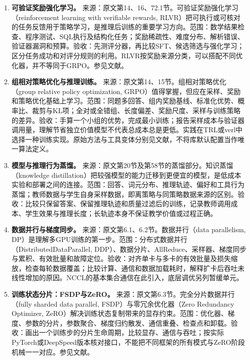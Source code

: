 \documentclass[UTF8,12pt,a4paper,fontset=fandol]{ctexart}
\begin{document}
\begin{enumerate}[resume=techrank]
\item \textbf{可验证奖励强化学习。}\label{tech:rlvr}
来源：原文第14、16、72.1节。可验证奖励强化学习（reinforcement learning with verifiable rewards, RLVR）把可执行或可核对的任务反馈用于策略学习，是推理后训练的重要学习方向。范围：数学结果检查、程序测试、SQL执行及结构化任务；奖励稀疏性、难度分布、解析错误、验证器漏洞和预算。验收：先测评分器，再比较SFT、候选筛选与强化学习；区分任务成功和对评分规则的利用。RLVR按奖励来源分类，可以搭配不同优化器，并不等同于GRPO。参见文献\cite{r1}。

\item \textbf{组相对策略优化与推理训练。}\label{tech:grpo}
来源：原文第14、15节。组相对策略优化（group relative policy optimization, GRPO）值得掌握，但应在采样、奖励和策略优化基础上学习。范围：同题多回答、组内奖励基线、标准化优势、概率比、裁剪与KL项；全对或全错组、长度偏差、奖励尺度、采样与训练策略的差异。验收：手算一个小组的优势，完成最小训练；报告采样成本与验证器调用量，理解节省独立价值模型不代表总成本总是更低。实践在TRL或verl中选择一种训练实现。原始方法与工具变体分别见文献\cite{grpo,trlgrpo}，不将库默认配置当作唯一算法定义。

\item \textbf{模型与推理行为蒸馏。}\label{tech:distillation}
来源：原文第20节及第58节的蒸馏部分。知识蒸馏（knowledge distillation）把较强模型的能力迁移到更便宜的模型，是低成本实验和部署之间的连接。范围：回答、词元分布、推理轨迹、偏好和工具行为蒸馏；教师数据与学生自身采样数据，即离策略与同策略数据来源的区别。验收：比较只保留答案、保留推理轨迹和质量过滤后的训练，记录教师调用成本、学生效果与推理长度；长轨迹本身不保证教学价值或过程正确。

\item \textbf{数据并行与梯度同步。}\label{tech:ddp}
来源：原文第6.1、6.2节。数据并行（data parallelism, DP）是理解多GPU训练的第一步。范围：分布式数据并行（DistributedDataParallel, DDP）、数据分片、AllReduce、采样器、梯度同步与累积、有效批量和故障定位。验收：对齐单卡与多卡的有效批量及损失缩放，检查每轮数据覆盖；比较计算、通信和数据加载耗时，解释扩卡后吞吐未线性增加的原因。NCCL的基本集合通信在此引入，底层调优另列暂缓单元。

\item \textbf{训练状态分片：FSDP与ZeRO。}\label{tech:fsdp}
来源：原文第6.3节。完全分片数据并行（fully sharded data parallel, FSDP）与零冗余优化器（Zero Redundancy Optimizer, ZeRO）解决训练状态复制带来的显存约束。范围：优化器、梯度、参数的分片，参数聚合、梯度归约散发、通信重叠、检查点和卸载。验收：画出一个训练步的分片生命周期，比较显存、通信与吞吐；按实际PyTorch或DeepSpeed版本核对接口，不能把不同框架的所有模式与ZeRO阶段机械一一对应。参见文献\cite{fsdp}。


\end{enumerate}
\end{document}
